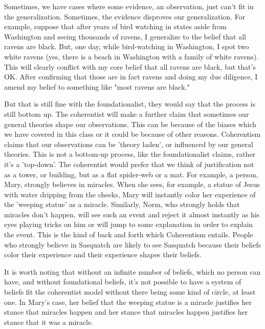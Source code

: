 Sometimes, we have cases where some evidence, an observation, just can't fit in the generalization. Sometimes, the evidence disproves our generalization. For example, suppose that after years of bird watching in states aside from Washington and seeing thousands of ravens, I generalize to the belief that all ravens are black. But, one day, while bird-watching in Washington, I spot two white ravens (yes, there is a beach in Washington with a family of white ravens). This will clearly conflict with my core belief that all ravens are black, but that's OK. After confirming that those are in fact ravens and doing my due diligence, I amend my belief to something like "most ravens are black."

But that is still fine with the foundationalist, they would say that the process is still bottom up. The coherentist will make a further claim that sometimes our general theories shape our observations. This can be because of the biases which we have covered in this class or it could be because of other reasons. Coherentism claims that our observations can be 'theory laden', or influenced by our general theories. This is not a bottom-up process, like the foundationalist claims, rather it's a 'top-down'. The coherentist would prefer that we think of justification not as a tower, or building, but as a flat spider-web or a mat. For example, a person, Mary, strongly believes in miracles. When she sees, for example, a statue of Jesus with water dripping from the cheeks, Mary will instantly color her experience of the 'weeping statue' as a miracle. Similarly, Norm, who strongly holds that miracles don't happen, will see such an event and reject it almost instantly as his eyes playing tricks on him or will jump to some explanation in order to explain the event. This is the kind of back and forth which Coherentism entails. People who strongly believe in Sasquatch are likely to see Sasquatch because their beliefs color their experience and their experience shapes their beliefs. 

It is worth noting that without an infinite number of beliefs, which no person can have, and without foundational beliefs, it's not possible to have a system of beliefs fit the coherentist model without there being some kind of circle, at least one. In Mary's case, her belief that the weeping statue is a miracle justifies her stance that miracles happen and her stance that miracles happen justifies her stance that it was a miracle.